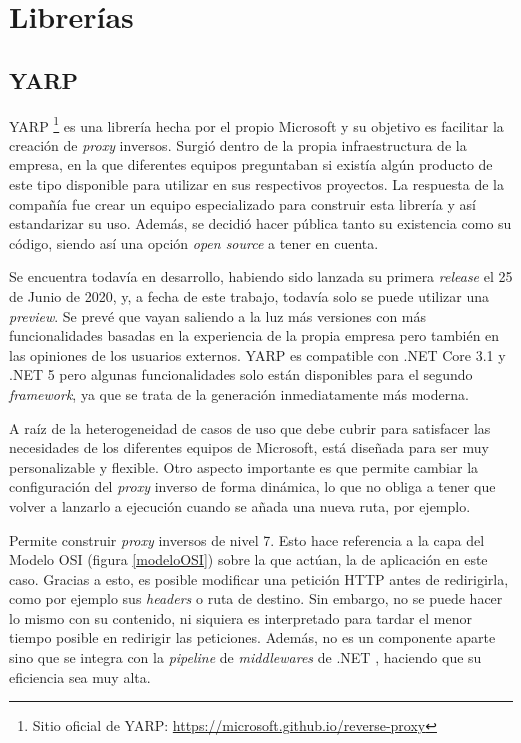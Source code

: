\documentclass[11pt,spanish,listoffigures]{tfgetsinf}
\begin{document}
	\section{Librerías}


		\subsection{YARP}

YARP \footnote{Sitio oficial de YARP: \url{https://microsoft.github.io/reverse-proxy}} es una librería hecha por el propio Microsoft \cite{Microsoft} y su objetivo es facilitar la creación de \emph{proxy} inversos. Surgió dentro de la propia infraestructura de la empresa, en la que diferentes equipos preguntaban si existía algún producto de este tipo disponible para utilizar en sus respectivos proyectos. La respuesta de la compañía fue crear un equipo especializado para construir esta librería y así estandarizar su uso. Además, se decidió hacer pública tanto su existencia como su código, siendo así una opción \emph{open source} a tener en cuenta.

Se encuentra todavía en desarrollo, habiendo sido lanzada su primera \emph{release} el 25 de Junio de 2020, y, a fecha de este trabajo, todavía solo se puede utilizar una \emph{preview}. Se prevé que vayan saliendo a la luz más versiones con más funcionalidades basadas en la experiencia de la propia empresa pero también en las opiniones de los usuarios externos. YARP es compatible con .NET Core 3.1 y .NET 5 pero algunas funcionalidades solo están disponibles para el segundo \emph{framework}, ya que se trata de la generación inmediatamente más moderna.

A raíz de la heterogeneidad de casos de uso que debe cubrir para satisfacer las necesidades de los diferentes equipos de Microsoft, está diseñada para ser muy personalizable y flexible. Otro aspecto importante es que permite cambiar la configuración del \emph{proxy} inverso de forma dinámica, lo que no obliga a tener que volver a lanzarlo a ejecución cuando se añada una nueva ruta, por ejemplo.

Permite construir \emph{proxy} inversos de nivel 7. Esto hace referencia a la capa del Modelo OSI (figura \ref{modeloOSI}) sobre la que actúan, la de aplicación en este caso. Gracias a esto, es posible modificar una petición HTTP antes de redirigirla, como por ejemplo sus \emph{headers} o ruta de destino. Sin embargo, no se puede hacer lo mismo con su contenido, ni siquiera es interpretado para tardar el menor tiempo posible en redirigir las peticiones. Además, no es un componente aparte sino que se integra con la \emph{pipeline} de \emph{middlewares} de .NET \cite{MiddlewaresPipeline}, haciendo que su eficiencia sea muy alta.
\end{document}
